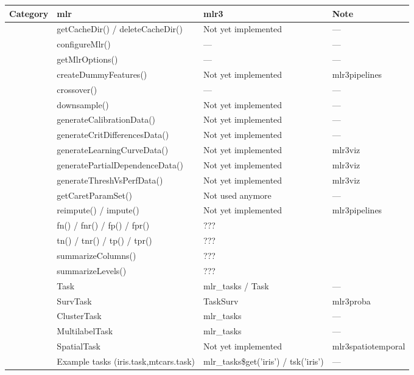 \documentclass[]{article}
\begin{document}
\begin{tabu} to 
\hline
Category & mlr & mlr3 & Note\\
\hline
 & getCacheDir() / deleteCacheDir() & Not yet implemented & ---\\
 & configureMlr() & --- & ---\\
 & getMlrOptions() & --- & ---\\
 & createDummyFeatures() & Not yet implemented & mlr3pipelines\\
 & crossover() & --- & ---\\
 & downsample() & Not yet implemented & ---\\
 & generateCalibrationData() & Not yet implemented & ---\\
 & generateCritDifferencesData() & Not yet implemented & ---\\
 & generateLearningCurveData() & Not yet implemented & mlr3viz\\
 & generatePartialDependenceData() & Not yet implemented & mlr3viz\\
 & generateThreshVsPerfData() & Not yet implemented & mlr3viz\\
 & getCaretParamSet() & Not used anymore & ---\\
 & reimpute() / impute() & Not yet implemented & mlr3pipelines\\
 & fn() / fnr() / fp() / fpr() & ??? & \\
 & tn() / tnr() / tp() / tpr() & ??? & \\
 & summarizeColumns() & ??? & \\
 & summarizeLevels() & ??? & \\
 & Task & mlr\_tasks / Task & ---\\
 & SurvTask & TaskSurv & mlr3proba\\
 & ClusterTask & mlr\_tasks & ---\\
 & MultilabelTask & mlr\_tasks & ---\\
 & SpatialTask & Not yet implemented & mlr3spatiotemporal\\
 & Example tasks (iris.task,mtcars.task) & mlr\_tasks\$get('iris') / tsk('iris') & ---\\

\end{tabu}
\end{document}
